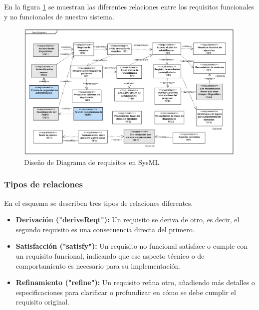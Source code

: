 \documentclass{article}
\begin{document}
En la figura \ref{fig:SysML} se muestran las diferentes relaciones entre los requisitos funcionales y no funcionales de nuestro sistema.

\begin{figure}
	\begin{center} 
		\includegraphics[width=1\textwidth]{images/SysML2.png}
		\caption{Diseño de Diagrama de requisitos en SysML}
		\label{fig:SysML}
	\end{center}
\end{figure}
\vspace{5cm}

\subsubsection{Tipos de relaciones}
En el esquema se describen tres tipos de relaciones diferentes.

\begin{itemize}
	\item \textbf{Derivación ("deriveReqt"):} Un requisito se deriva de otro, es decir, el segundo requisito es una consecuencia directa del primero.
	\item \textbf{Satisfacción ("satisfy"):} Un requisito no funcional satisface o cumple con un requisito funcional, indicando que ese aspecto técnico o de comportamiento es necesario para su implementación.
	\item \textbf{Refinamiento ("refine"):} Un requisito refina otro, añadiendo más detalles o especificaciones para clarificar o profundizar en cómo se debe cumplir el requisito original.
\end{itemize}
\end{document}
